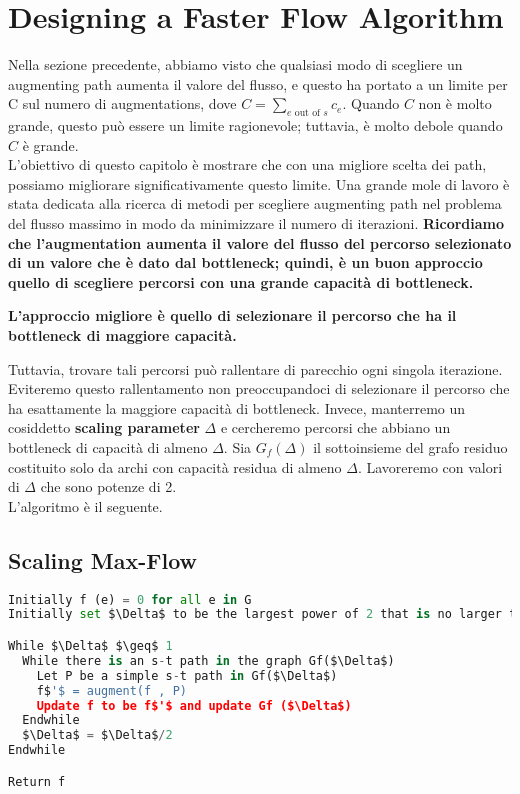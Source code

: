 \chapter{Designing a Faster Flow Algorithm}

Nella sezione precedente, abbiamo visto che qualsiasi modo di scegliere un
augmenting path aumenta il valore del flusso, e questo ha portato a un limite
per C sul numero di augmentations, dove $C = \sum_{e \text{ out of }s} c_e$.
Quando $C$ non è molto grande, questo può essere un limite ragionevole;
tuttavia, è molto debole quando $C$ è grande.\\

L'obiettivo di questo capitolo è mostrare che con una migliore scelta dei
path, possiamo migliorare significativamente questo limite. Una grande
mole di lavoro è stata dedicata alla ricerca di metodi per scegliere
augmenting path nel problema del flusso massimo in modo da minimizzare
il numero di iterazioni. \textbf{Ricordiamo che l'augmentation aumenta
  il valore del flusso del percorso selezionato di un valore che è dato
  dal bottleneck; quindi, è un buon approccio quello di scegliere percorsi
  con una grande capacità di bottleneck.}

\begin{myblockquote}
  \textbf{L'approccio migliore è quello di selezionare il percorso che ha
    il bottleneck di maggiore capacità.}
\end{myblockquote}

Tuttavia, trovare tali percorsi può rallentare di parecchio ogni singola
iterazione. Eviteremo questo rallentamento non preoccupandoci di
selezionare il percorso che ha esattamente la maggiore capacità di
bottleneck. Invece, manterremo un cosiddetto \textbf{scaling parameter}
$\Delta$ e cercheremo percorsi che abbiano un bottleneck di capacità
di almeno $\Delta$. Sia $G_f(\Delta)$ il sottoinsieme del grafo
residuo costituito solo da archi con capacità residua di almeno
$\Delta$. Lavoreremo con valori di $\Delta$ che sono potenze di 2.\\

L'algoritmo è il seguente.

\section{Scaling Max-Flow}


\begin{lstlisting}[language=Python, mathescape=true]
Initially f (e) = 0 for all e in G
Initially set $\Delta$ to be the largest power of 2 that is no larger than the maximum capacity out of s: $\Delta$ $\leq$ max(e out of s ce)

While $\Delta$ $\geq$ 1
  While there is an s-t path in the graph Gf($\Delta$)
    Let P be a simple s-t path in Gf($\Delta$)
    f$'$ = augment(f , P)
    Update f to be f$'$ and update Gf ($\Delta$)
  Endwhile
  $\Delta$ = $\Delta$/2
Endwhile

Return f
\end{lstlisting}

